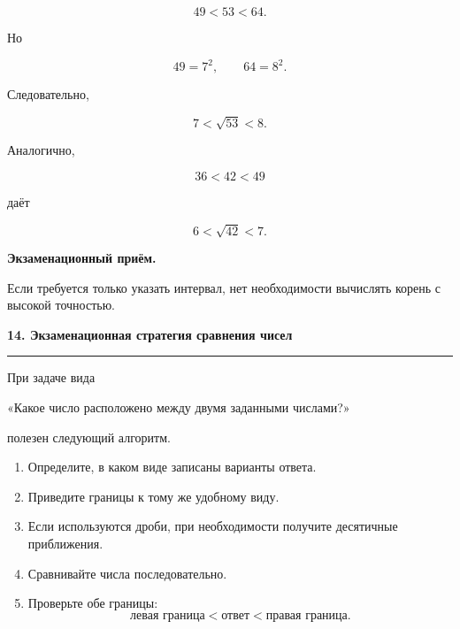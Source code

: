 \documentclass[a4paper,12pt]{article}
\newcommand{\topic}[1]{%
    \par\vspace{0.9em}%
    {\Large\bfseries\color{darkaccent}#1}\par
    \vspace{0.25em}
    \noindent
    \color{accent}\rule{\linewidth}{0.6pt}
    \color{black}
    \vspace{0.55em}
}
\newcommand{\important}[1]{%
    \textbf{\color{darkaccent}#1}%
}
\begin{document}
\[
49<53<64.
\]

Но

\[
49=7^2,
\qquad
64=8^2.
\]

Следовательно,

\[
7<\sqrt{53}<8.
\]

\begin{center}
\end{center}

Аналогично,

\[
36<42<49
\]

даёт

\[
6<\sqrt{42}<7.
\]

\important{Экзаменационный приём.}
Если требуется только указать интервал,
нет необходимости вычислять корень с высокой точностью.


\topic{14. Экзаменационная стратегия сравнения чисел}

При задаче вида

\begin{center}
«Какое число расположено между двумя заданными числами?»
\end{center}

полезен следующий алгоритм.

\begin{enumerate}[label=\arabic*)]
    \item Определите, в каком виде записаны варианты ответа.
    \item Приведите границы к тому же удобному виду.
    \item Если используются дроби, при необходимости получите
    десятичные приближения.
    \item Сравнивайте числа последовательно.
    \item Проверьте обе границы:
    \[
    \text{левая граница}
    <
    \text{ответ}
    <
    \text{правая граница}.
    \]
\end{enumerate}
\end{document}
